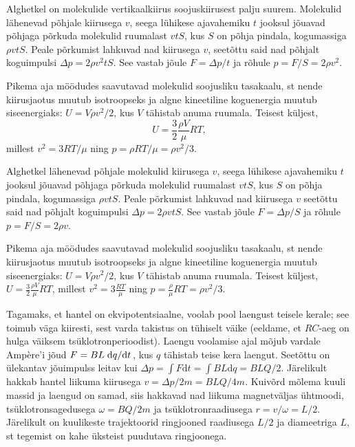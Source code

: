 \documentclass[10pt]{article}
\begin{document}

\solu
Alghetkel on molekulide vertikaalkiirus soojuskiirusest palju suurem. Molekulid lähenevad põhjale kiirusega $v$, seega lühikese ajavahemiku $t$ jooksul jõuavad põhjaga põrkuda molekulid ruumalast $vtS$, kus $S$ on põhja pindala, kogumassiga $\rho vtS$. Peale põrkumist lahkuvad nad kiirusega $v$, seetõttu said nad põhjalt koguimpulsi $\Delta p=2\rho v^2tS$. See vastab jõule $F=\Delta p/t$ ja rõhule $p=F/S=2\rho v^2$.

Pikema aja möödudes saavutavad molekulid soojusliku tasakaalu, st nende kiirusjaotus muutub isotroopseks ja algne kineetiline koguenergia muutub siseenergiaks: $U=V\rho v^2/2$, kus $V$ tähistab anuma ruumala. Teisest küljest,
\[
U=\frac 32 \frac{\rho V}\mu RT,
\]
millest $v^2=3 RT/\mu$ ning $p=\rho RT/\mu=\rho v^2/3$.
\probend
\bigskip


\solu
Alghetkel lähenevad põhjale molekulid kiirusega $v$, seega lühikese ajavahemiku $t$ jooksul jõuavad põhjaga põrkuda molekulid ruumalast $vtS$, kus $S$ on põhja pindala, kogumassiga $\rho vtS$. Peale põrkumist lahkuvad nad kiirusega $v$ seetõttu said nad põhjalt koguimpulsi $\Delta p=2\rho vtS$. See vastab jõule $F=\Delta p/S$ ja rõhule $p=F/S=2\rho v$.

Pikema aja möödudes saavutavad molekulid soojusliku tasakaalu, st nende kiirusjaotus muutub isotroopseks ja algne kineetiline koguenergia muutub siseenergiaks: $U=V\rho v^2/2$, kus $V$ tähistab anuma ruumala. Teisest küljest, $U=\frac 32 \frac{\rho V}\mu RT$, millest $v^2=3 \frac{ RT}\mu$ ning $p=\frac{\rho}\mu RT=\rho v^2/3$.
\probend
\bigskip


\solu
Tagamaks, et hantel on ekvipotentsiaalne, voolab pool laengust teisele kerale; see toimub väga kiiresti, sest varda takistus on tühiselt väike (eeldame, et $RC$-aeg on hulga väiksem tsüklotronperioodist). Laengu voolamise ajal mõjub vardale Ampère'i jõud $F=BL\dv*{q}{t}$, kus $q$ tähistab teise kera laengut. Seetõttu on ülekantav jõuimpulss leitav kui $\Delta p=\int F\mathrm dt=\int BL\mathrm dq = BLQ/2$. Järelikult hakkab hantel liikuma kiirusega $v=\Delta p/2m=BLQ/4m$. Kuivõrd mõlema kuuli massid ja laengud on samad, siis hakkavad nad liikuma magnetväljas ühtmoodi, tsüklotronsagedusega $\omega=BQ/2m$ ja tsüklotronraadiusega $r=v/\omega=L/2$. Järelikult on kuulikeste trajektoorid ringjooned raadiusega $L/2$ ja diameetriga $L$, st tegemist on kahe üksteist puudutava ringjoonega.
\probend
\bigskip
\end{document}
